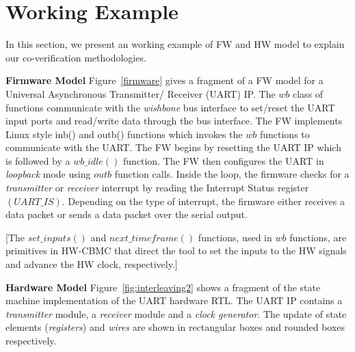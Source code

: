 \documentclass[sigconf]{acmart}
\newcommand{\rmcmt}[1]{{\color{magenta} [{#1}]}}
\begin{document}
\section{Working Example}
In this section, we present an working example of FW and HW model to explain our 
co-verification methodologies.  

\textbf{Firmware Model} Figure~\ref{firmware} gives a fragment of a FW model for a Universal 
Asynchronous Transmitter/ Receiver (UART) IP.  The
$wb$ class of functions communicate with the {\em wishbone} bus interface to
set/reset the UART input ports and read/write data through the bus
interface.  The FW implements Linux style inb() and outb() functions which
invokes the $wb$ functions to communicate with the UART.  The FW begins 
by resetting the UART IP which is followed by a $wb\_idle()$ function.  The 
FW then configures the UART in {\em loopback} mode using $outb$ function calls. 
Inside the loop, the firmware checks for a {\em transmitter} or {\em
receiver} interrupt by reading the Interrupt Status register $(UART\_IS)$. 
Depending on the type of interrupt, the firmware either receives a data packet 
or sends a data packet over the serial output. 

\rmcmt{The $set\_inputs()$ and
$next\_timeframe()$ functions, used in $wb$ functions, are 
primitives in \textsc{HW-CBMC} that direct the tool to set the 
inputs to the HW signals and advance the HW clock, respectively.}

\textbf{Hardware Model} Figure~\ref{fig:interleaving2} shows a fragment of the state machine 
implementation of the UART hardware RTL.  The UART IP contains a
\emph{transmitter} module, a \emph{receiver} module and a \emph{clock
generator}.  The update of state elements (\emph{registers}) and 
\emph{wires} are shown in rectangular boxes and rounded boxes respectively.  
\end{document}
